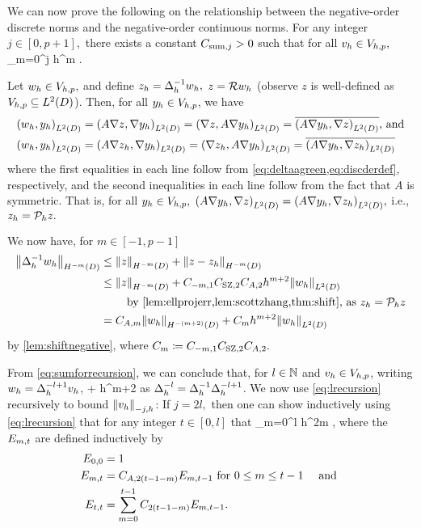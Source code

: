 We can now prove the following  on the relationship between the negative-order discrete norms and the negative-order continuous norms.
\label{lem:negdiscsum}
For any integer $j \in [0,p+1],$ there exists a constant $C_{\mathrm{sum},j} > 0$ such that for all $v_{h} \in V_{h,p},$
\beqs
\Nmjh{\vh} \leq \Csumj \sum_{m=0}^j h^{m} .
\eeqs
\ele

Let $w_{h} \in V_{h,p},$ and define $z_{h} = \Delta_{h}^{-1} w_{h},$ $z = \mathcal R w_{h}$ (observe $z$ is well-defined as $\Vhp \subseteq \LtD$). Then, for all $y_{h} \in V_{h,p}$, we have
\begin{align*}
\IPLtD{\wh}{\yh} &= \IPLtD{A \grad z}{\grad \yh} = \IPLtD{\grad z}{A\grad \yh} = \overline{\IPLtD{A\grad \yh}{\grad z}} \text{, and}\\
\IPLtD{\wh}{\yh} &= \IPLtD{A \grad \zh}{\grad \yh} = \IPLtD{\grad \zh}{A\grad \yh} = \overline{\IPLtD{A\grad \yh}{\grad \zh}}
\end{align*}
where the first equalities in each line follow from \cref{eq:deltaagreen,eq:discderdef}, respectively, and the second inequalities in each line follow from the fact that $A$ is symmetric. That is, for all $y_{h} \in V_{h,p},$ $\IPLtD{A\grad \yh}{\grad z} = \IPLtD{A\grad \yh}{\grad \zh},$ i.e., $z_{h} = \mathcal P_{h} z.$

We now have, for $m \in [-1,p-1]$
\begin{align}
\NHmmD{\DeltahI \wh} &\leq \NHmmD{z} + \NHmmD{z-\zh}\nonumber\\
&\leq \NHmmD{z} + \Cmmo \Cinterpt \CAt h^{m+2} \NLtD{\wh}\nonumber\\
&\quad\quad\text{ by \cref{lem:ellprojerr,lem:scottzhang,thm:shift}, as }\zh = \Ph z\nonumber\\
&= \CAm \NHmmmtD{\wh} + \Cm h^{m+2} \NLtD{\wh}\label{eq:sumforrecursion}
\end{align}
by \cref{lem:shiftnegative}, where $C_{m} \coloneqq C_{-m,1} C_{\mathrm{SZ},2} C_{A,2}.$

From \cref{eq:sumforrecursion}, we can conclude that, for $l \in \mathbb N$ and $v_{h} \in V_{h,p}$, writing $w_{h} = \Delta_{h}^{-l+1} v_{h}$,
\beq\label{eq:lrecursion}
\NHmmD{\Deltahml \vh} \leq \CAm \NHmmmtD{\Deltahmlpo \vh} + \Cm h^{m+2} \NLtD{\Deltahmlpo \vh}
\eeq
as $\Delta_{h}^{-l} = \Delta_{h}^{-1} \Delta_{h}^{-l+1}$. We now use \cref{eq:lrecursion} recursively to bound $\Nmjh{\vh}$:
If $j = 2l,$ then one can show inductively using \cref{eq:lrecursion} that for any integer $t \in [0,l]$ that
\beq\label{eq:evenrecursivesum}
 \leq \sum_{m=0}^l  h^{2m}  ,
\eeq
where the $E_{m,t}$ are defined inductively by
\begin{align}
\label{eq:Emt1}E_{0,0} &=1\\
\label{eq:Emt2}E_{m,t} &= C_{A,2(t-1-m)} E_{m,t-1} \text{ for } 0 \leq m \leq t-1 \quad\text{ and }\\
\label{eq:Emt3}E_{t,t} &= \sum_{m=0}^{t-1} C_{2(t-1-m)} E_{m,t-1}.
\end{align}

